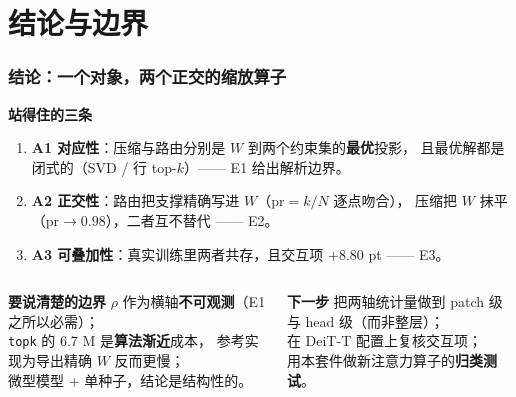 \documentclass[10pt,aspectratio=169,mathserif]{beamer}
\begin{document}
\section[结论]{结论与边界}

\begin{frame}
\frametitle{\textbf{结论：一个对象，两个正交的缩放算子}}
  \begin{block}{\textbf{站得住的三条}}
    \small
    \begin{enumerate}
      \item \textbf{A1 对应性}：压缩与路由分别是 $W$ 到两个约束集的\textbf{最优}投影，
            且最优解都是闭式的（SVD / 行 top-$k$）—— E1 给出解析边界。
      \item \textbf{A2 正交性}：路由把支撑精确写进 $W$（$\mathrm{pr}=k/N$ 逐点吻合），
            压缩把 $W$ 抹平（$\mathrm{pr}\to0.98$），二者互不替代 —— E2。
      \item \textbf{A3 可叠加性}：真实训练里两者共存，且交互项 $+8.80$ pt —— E3。
    \end{enumerate}
  \end{block}

  \begin{columns}[T]
      \begin{block}{\textbf{要说清楚的边界}}
        \footnotesize
        $\rho$ 作为横轴\textbf{不可观测}（E1 之所以必需）；\\
        \texttt{topk} 的 6.7 M 是\textbf{算法渐近}成本，
        参考实现为导出精确 $W$ 反而更慢；\\
        微型模型 + 单种子，结论是结构性的。
      \end{block}
      \begin{block}{\textbf{下一步}}
        \footnotesize
        把两轴统计量做到 patch 级与 head 级（而非整层）；\\
        在 DeiT-T 配置上复核交互项；\\
        用本套件做新注意力算子的\textbf{归类测试}。
      \end{block}
  \end{columns}
\end{frame}

\end{document}
